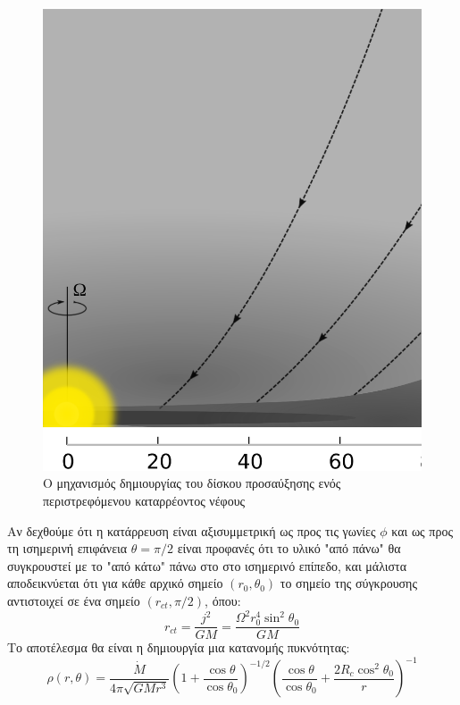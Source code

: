 \documentclass[a4paper,12pt]{memoir}
\def\medpage{13cm}
\begin{document}
\begin{figure}[h]
	\centering
	\includegraphics[width=\medpage]{images/disk2.ps}
	\caption{Ο μηχανισμός δημιουργίας του δίσκου προσαύξησης ενός περιστρεφόμενου καταρρέοντος νέφους}
\end{figure}


Αν δεχθούμε ότι η κατάρρευση είναι αξισυμμετρική ως προς τις γωνίες $\phi$ και ως προς τη ισημερινή επιφάνεια $\theta = \pi/2$ είναι προφανές ότι το υλικό "από πάνω" θα συγκρουστεί με το "από κάτω" πάνω στο στο ισημερινό επίπεδο, και μάλιστα αποδεικνύεται ότι για κάθε αρχικό σημείο $(r_0,\theta _0)$ το σημείο της σύγκρουσης αντιστοιχεί σε ένα σημείο $(r_{ct},\pi/2)$, όπου:
\begin{equation}
r_{ct}=\frac{j^2}{GM}=\frac{\Omega^2 r_0 ^4 \sin ^2 \theta_0}{GM}
\end{equation}
Το αποτέλεσμα θα είναι η δημιουργία μια κατανομής πυκνότητας:
\begin{equation}
\rho (r,\theta) =\frac{\dot{M}}{4 \pi \sqrt{G M r^3}}\left(1+\frac{\cos \theta}{\cos \theta _0}\right)^{-1/2} \left( \frac{\cos \theta}{\cos \theta _0} + \frac{2 R_c \cos^2 \theta _0}{r} \right) ^{-1} 
\end{equation}
\end{document}
